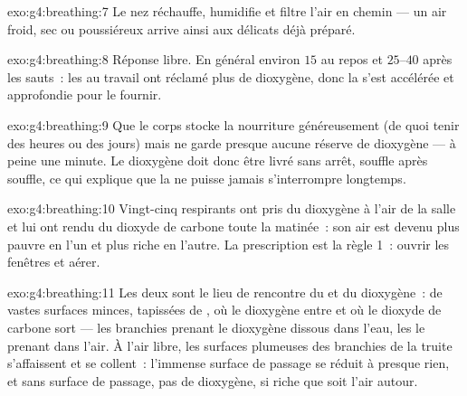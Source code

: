 \begin{solution}{exo:g4:breathing:7}
Le nez réchauffe, humidifie et filtre l'air en chemin --- un air
froid, sec ou poussiéreux arrive ainsi aux délicats  déjà
préparé.
\end{solution}

\begin{solution}{exo:g4:breathing:8}
Réponse libre. En général environ $15$ au repos et $25$--$40$ après
les sauts~: les  au travail ont réclamé plus de dioxygène,
donc la  s'est accélérée et approfondie pour le fournir.
\end{solution}

\begin{solution}{exo:g4:breathing:9}
Que le corps stocke la nourriture généreusement (de quoi tenir des
heures ou des jours) mais ne garde presque aucune réserve de
dioxygène --- à peine une minute. Le dioxygène doit donc être livré
sans arrêt, souffle après souffle, ce qui explique que la
 ne puisse jamais s'interrompre longtemps.
\end{solution}

\begin{solution}{exo:g4:breathing:10}
Vingt-cinq respirants ont pris du dioxygène à l'air de la salle et
lui ont rendu du dioxyde de carbone toute la matinée~: son air est
devenu plus pauvre en l'un et plus riche en l'autre. La
prescription est la règle 1~: ouvrir les fenêtres et aérer.
\end{solution}

\begin{solution}{exo:g4:breathing:11}
Les deux sont le lieu de rencontre du  et du dioxygène~: de
vastes surfaces minces, tapissées de , où le dioxygène entre et
où le dioxyde de carbone sort --- les branchies prenant le dioxygène
dissous dans l'eau, les  le prenant dans l'air. À l'air
libre, les surfaces plumeuses des branchies de la truite s'affaissent
et se collent~: l'immense surface de passage se réduit à presque
rien, et sans surface de passage, pas de dioxygène, si riche que
soit l'air autour.
\end{solution}
